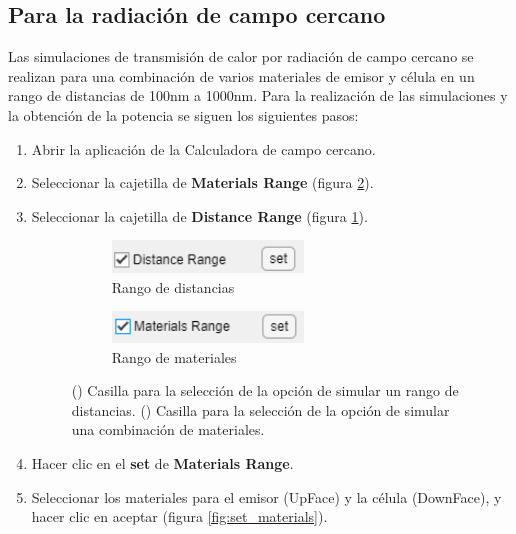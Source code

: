 \subsection{Para la radiación de campo cercano}
Las simulaciones de transmisión de calor por radiación de campo cercano se realizan para una combinación de varios materiales de emisor y célula en un rango de distancias de 100nm a 1000nm. Para la realización de las simulaciones y la obtención de la potencia se siguen los siguientes pasos:
\begin{enumerate}
	\item Abrir la aplicación de la Calculadora de campo cercano.
	\item Seleccionar la cajetilla de \textbf{Materials Range} (figura \ref{fig:check_materials}). 
	\item Seleccionar la cajetilla de \textbf{Distance Range} (figura \ref{fig:check_distances}).
	\begin{figure}[H]%
	\begin{subfigure}[b]{0.48\textwidth}
		\centering
			\includegraphics[width=0.6\textwidth]{figuras/Procedimiento_Simulaciones/Radiacion/check_distances2.png}
		\caption{Rango de distancias}
		\label{fig:check_distances}
	\end{subfigure}
	\hfill
	\begin{subfigure}[b]{0.48\textwidth}
		\centering
			\includegraphics[width=0.6\textwidth]{figuras/Procedimiento_Simulaciones/Radiacion/check_materials2.png}
		\caption{Rango de materiales}
		\label{fig:check_materials}
	\end{subfigure}
	\caption{() Casilla para la selección de la opción de simular un rango de distancias. () Casilla para la selección de la opción de simular una combinación de materiales.}%
	\label{fig:checkboxes}%
	\end{figure}
	\item Hacer clic en el \textbf{set} de \textbf{Materials Range}.
	\item Seleccionar los materiales para el emisor (UpFace) y la célula (DownFace), y hacer clic en aceptar (figura \ref{fig:set_materials}).

\end{enumerate}
